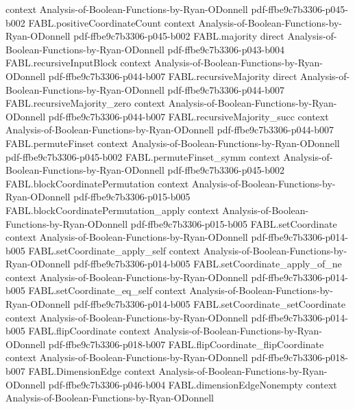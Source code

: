 \begin{theorem}
  {context}
  {Analysis-of-Boolean-Functions-by-Ryan-ODonnell}
  {pdf-ffbe9c7b3306-p045-b002}
\proofstep
  {FABL.positiveCoordinateCount}
  {context}
  {Analysis-of-Boolean-Functions-by-Ryan-ODonnell}
  {pdf-ffbe9c7b3306-p045-b002}
\proofstep
  {FABL.majority}
  {direct}
  {Analysis-of-Boolean-Functions-by-Ryan-ODonnell}
  {pdf-ffbe9c7b3306-p043-b004}
\proofstep
  {FABL.recursiveInputBlock}
  {context}
  {Analysis-of-Boolean-Functions-by-Ryan-ODonnell}
  {pdf-ffbe9c7b3306-p044-b007}
\proofstep
  {FABL.recursiveMajority}
  {direct}
  {Analysis-of-Boolean-Functions-by-Ryan-ODonnell}
  {pdf-ffbe9c7b3306-p044-b007}
\proofstep
  {FABL.recursiveMajority_zero}
  {context}
  {Analysis-of-Boolean-Functions-by-Ryan-ODonnell}
  {pdf-ffbe9c7b3306-p044-b007}
\proofstep
  {FABL.recursiveMajority_succ}
  {context}
  {Analysis-of-Boolean-Functions-by-Ryan-ODonnell}
  {pdf-ffbe9c7b3306-p044-b007}
\proofstep
  {FABL.permuteFinset}
  {context}
  {Analysis-of-Boolean-Functions-by-Ryan-ODonnell}
  {pdf-ffbe9c7b3306-p045-b002}
\proofstep
  {FABL.permuteFinset_symm}
  {context}
  {Analysis-of-Boolean-Functions-by-Ryan-ODonnell}
  {pdf-ffbe9c7b3306-p045-b002}
\proofstep
  {FABL.blockCoordinatePermutation}
  {context}
  {Analysis-of-Boolean-Functions-by-Ryan-ODonnell}
  {pdf-ffbe9c7b3306-p015-b005}
\proofstep
  {FABL.blockCoordinatePermutation_apply}
  {context}
  {Analysis-of-Boolean-Functions-by-Ryan-ODonnell}
  {pdf-ffbe9c7b3306-p015-b005}
\proofstep
  {FABL.setCoordinate}
  {context}
  {Analysis-of-Boolean-Functions-by-Ryan-ODonnell}
  {pdf-ffbe9c7b3306-p014-b005}
\proofstep
  {FABL.setCoordinate_apply_self}
  {context}
  {Analysis-of-Boolean-Functions-by-Ryan-ODonnell}
  {pdf-ffbe9c7b3306-p014-b005}
\proofstep
  {FABL.setCoordinate_apply_of_ne}
  {context}
  {Analysis-of-Boolean-Functions-by-Ryan-ODonnell}
  {pdf-ffbe9c7b3306-p014-b005}
\proofstep
  {FABL.setCoordinate_eq_self}
  {context}
  {Analysis-of-Boolean-Functions-by-Ryan-ODonnell}
  {pdf-ffbe9c7b3306-p014-b005}
\proofstep
  {FABL.setCoordinate_setCoordinate}
  {context}
  {Analysis-of-Boolean-Functions-by-Ryan-ODonnell}
  {pdf-ffbe9c7b3306-p014-b005}
\proofstep
  {FABL.flipCoordinate}
  {context}
  {Analysis-of-Boolean-Functions-by-Ryan-ODonnell}
  {pdf-ffbe9c7b3306-p018-b007}
\proofstep
  {FABL.flipCoordinate_flipCoordinate}
  {context}
  {Analysis-of-Boolean-Functions-by-Ryan-ODonnell}
  {pdf-ffbe9c7b3306-p018-b007}
\proofstep
  {FABL.DimensionEdge}
  {context}
  {Analysis-of-Boolean-Functions-by-Ryan-ODonnell}
  {pdf-ffbe9c7b3306-p046-b004}
\proofstep
  {FABL.dimensionEdgeNonempty}
  {context}
  {Analysis-of-Boolean-Functions-by-Ryan-ODonnell}

\end{theorem}

